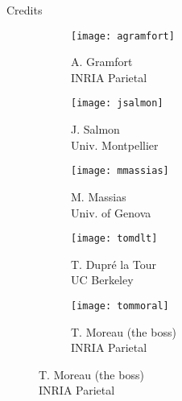 \documentclass[unknownkeysallowed]{beamer}
\begin{document}
\begin{frame}{Credits}
\begin{figure}
     \centering
     \begin{subfigure}[b]{0.188\textwidth}
         \centering
         \texttt{[image: agramfort]}
         \caption{A. Gramfort\\INRIA Parietal}
     \end{subfigure}
     \hfill
     \begin{subfigure}[b]{0.188\textwidth}
         \centering
		\texttt{[image: jsalmon]}
         \caption{J. Salmon\\Univ. Montpellier}
     \end{subfigure}
	 \hfill
     \begin{subfigure}[b]{0.188\textwidth}
         \centering
		 \texttt{[image: mmassias]}
         \caption{M. Massias\\Univ. of Genova }
     \end{subfigure}
     \hfill
     \begin{subfigure}[b]{0.188\textwidth}
         \centering
		\texttt{[image: tomdlt]}
        \caption{T. Dupré la Tour\\ UC Berkeley}
     \end{subfigure}
	 \hfill
     \begin{subfigure}[b]{0.188\textwidth}
         \centering
		\texttt{[image: tommoral]}
        \caption{T. Moreau (the boss)\\ INRIA Parietal}
     \end{subfigure}
\end{figure}
\end{frame}
\end{document}
